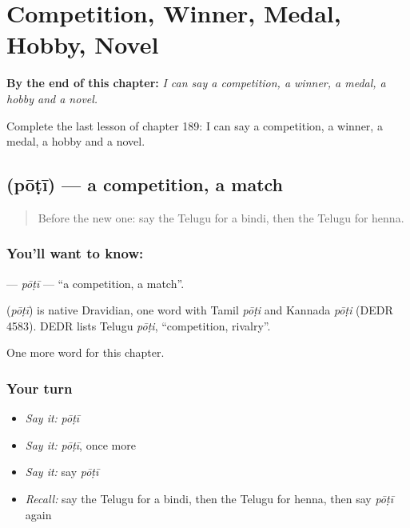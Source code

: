 
\chapter{Competition, Winner, Medal, Hobby, Novel}
\label{ch:te-competition-winner-medal-hobby-novel}

\begin{chapteropening}
\textbf{By the end of this chapter:} \emph{I can say a competition, a winner, a medal, a hobby and a novel.}

Complete the last lesson of chapter 189: I can say a competition, a winner, a medal, a hobby and a novel.
\end{chapteropening}

\section[\texorpdfstring{\te{పోటీ} (pōṭī)}{పోటీ (pōṭī)}]{ (pōṭī) — a competition, a match}

\label{lesson:TE-C189-poti}



\begin{quote}
Before the new one: say the Telugu for a bindi, then the Telugu for henna.
\end{quote}

\subsection*{You'll want to know: }
\textbf{} — \emph{pōṭī} — \textquotedblleft{}a competition, a match\textquotedblright{}.

\begin{cousinweb}
\textbf{} (\emph{pōṭī}) is native Dravidian, one word with Tamil \emph{pōṭi} and Kannada \emph{pōṭi} (DEDR 4583). DEDR lists Telugu \emph{pōṭi}, \textquotedblleft{}competition, rivalry\textquotedblright{}.
\end{cousinweb}

\begin{grammarlens}[title={What you've built}]
One more word for this chapter.
\end{grammarlens}

\subsection*{Your turn}
\begin{itemize}
\raggedright
  \item \emph{Say it:} \emph{pōṭī}
  \item \emph{Say it:} \emph{pōṭī}, once more
  \item \emph{Say it:} say \emph{pōṭī}
  \item \emph{Recall:} say the Telugu for a bindi, then the Telugu for henna, then say \emph{pōṭī} again
\end{itemize}

